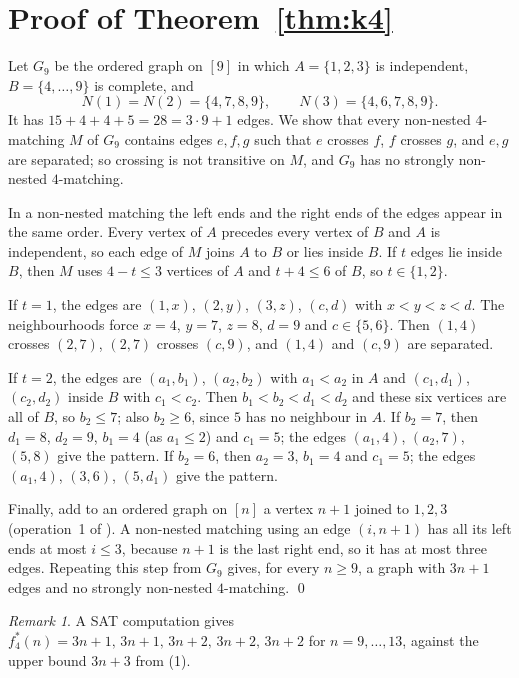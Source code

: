 \documentclass[11pt]{amsart}
\theoremstyle{definition}\newtheorem{problem}{Problem}
\theoremstyle{remark}\newtheorem*{remark}{Remark}
\begin{document}
\section{Proof of Theorem~\ref{thm:k4}}
Let $G_9$ be the ordered graph on $[9]$ in which $A=\{1,2,3\}$ is independent, $B=\{4,\dots,9\}$ is complete, and
\[
N(1)=N(2)=\{4,7,8,9\},\qquad N(3)=\{4,6,7,8,9\}.
\]
It has $15+4+4+5=28=3\cdot9+1$ edges. We show that every non-nested $4$-matching $M$ of $G_9$ contains edges
$e,f,g$ such that $e$ crosses $f$, $f$ crosses $g$, and $e,g$ are separated; so crossing is not transitive on $M$, and
$G_9$ has no strongly non-nested $4$-matching.

In a non-nested matching the left ends and the right ends of the edges appear in the same order. Every vertex of $A$
precedes every vertex of $B$ and $A$ is independent, so each edge of $M$ joins $A$ to $B$ or lies inside $B$. If $t$
edges lie inside $B$, then $M$ uses $4-t\le3$ vertices of $A$ and $t+4\le6$ of $B$, so $t\in\{1,2\}$.

If $t=1$, the edges are $(1,x)$, $(2,y)$, $(3,z)$, $(c,d)$ with $x<y<z<d$. The neighbourhoods force $x=4$, $y=7$, $z=8$,
$d=9$ and $c\in\{5,6\}$. Then $(1,4)$ crosses $(2,7)$, $(2,7)$ crosses $(c,9)$, and $(1,4)$ and $(c,9)$ are separated.

If $t=2$, the edges are $(a_1,b_1)$, $(a_2,b_2)$ with $a_1<a_2$ in $A$ and $(c_1,d_1)$, $(c_2,d_2)$ inside $B$ with
$c_1<c_2$. Then $b_1<b_2<d_1<d_2$ and these six vertices are all of $B$, so $b_2\le7$; also $b_2\ge6$, since $5$ has
no neighbour in $A$. If $b_2=7$, then $d_1=8$, $d_2=9$, $b_1=4$ (as $a_1\le2$) and $c_1=5$; the edges $(a_1,4)$,
$(a_2,7)$, $(5,8)$ give the pattern. If $b_2=6$, then $a_2=3$, $b_1=4$ and $c_1=5$; the edges $(a_1,4)$, $(3,6)$,
$(5,d_1)$ give the pattern.

Finally, add to an ordered graph on $[n]$ a vertex $n+1$ joined to $1,2,3$ (operation~1 of
\cite[Section~2.2]{BFT}). A non-nested matching using an edge
$(i,n+1)$ has all its left ends at most $i\le3$, because $n+1$ is the last right end, so it has at most three edges.
Repeating this step from $G_9$ gives, for every $n\ge9$, a graph with $3n+1$ edges and no strongly non-nested
$4$-matching. \qed

\begin{remark}
A SAT computation gives $f^*_4(n)=3n+1,\,3n+1,\,3n+2,\,3n+2,\,3n+2$ for $n=9,\dots,13$, against the upper bound $3n+3$
from (1).
\end{remark}
\end{document}
